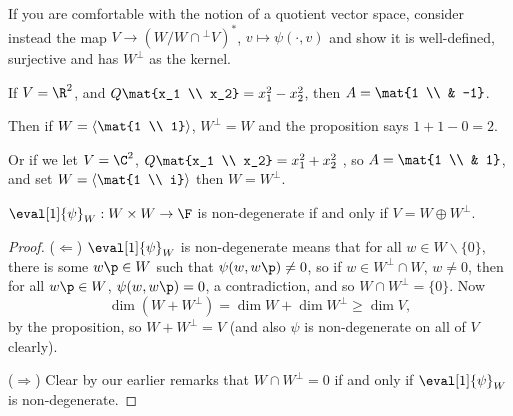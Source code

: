 \begin{remark}
	If you are comfortable with the notion of a quotient vector space, consider instead the map  $V \to (W/W\cap{}^\perp V)^*$, $v\mapsto \psi(\cdot,v)$ and show it is well-defined, surjective and has $W^\perp$ as the kernel. %
\end{remark}

\begin{example}
	If $V=\R^2$, and $Q\mat{x_1 \\ x_2} = x_1^2 - x_2^2$, then $A=\mat{1 \\ & -1}$. %
	
	Then if $W=\left\langle \mat{1 \\ 1} \right\rangle$, $W^\perp=W$ and the proposition says $1+1-0=2$. %
	
	Or if we let $V=\C^2$, $Q\mat{x_1 \\ x_2} = x_1^2 + x_2^2$ , so $A = \mat{1 \\ & 1}$, and set $W=\left\langle \mat{1 \\ i} \right\rangle$ then $W=W^\perp$. %
\end{example}

\begin{corollary}
	$\eval[1]{\psi}_W:W\times W\to\F$ is non-degenerate if and only if $V=W\oplus W^\perp$. %
\end{corollary}

\begin{proof}
	($\Leftarrow$) $\eval[1]{\psi}_W$ is non-degenerate means that for all $w\in W\backslash\{0\}$, there is some $w\p\in W$ such that $\psi(w,w\p)\neq 0$, so if $w\in W^\perp \cap W$, $w\neq 0$, then for all $w\p \in W$, $\psi(w,w\p)=0$, a contradiction, and so $W\cap W^\perp = \{0\}$. Now %
	\begin{equation*}
		\dim(W+W^\perp) = \dim W + \dim W^\perp \geq \dim V,
	\end{equation*}
	by the proposition, so $W+W^\perp=V$ (and also $\psi$ is non-degenerate on all of $V$ clearly).
	
	($\Rightarrow$) Clear by our earlier remarks that $W\cap W^\perp=0$ if and only if $\eval[1]{\psi}_W$ is non-degenerate. %
\end{proof}

\newcommand{\arrmat}[1]{\fbox{$\begin{array}{cc} #1 \end{array}$}}
\newcommand{\arrrmat}[1]{\fbox{$\begin{array}{ccc} #1 \end{array}$}}

